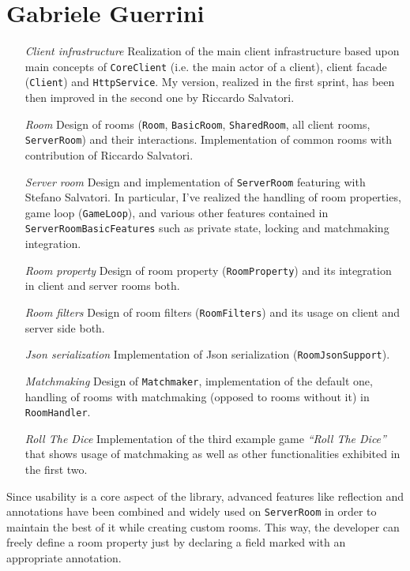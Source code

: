 \section{Gabriele Guerrini}

\begin{itemize}

\item[\em{Client infrastructure}] Realization of the main client infrastructure based upon main concepts of \texttt{CoreClient} (i.e. the main actor of a client), client facade (\texttt{Client}) and \texttt{HttpService}. My version, realized in the first sprint, has been then improved in the second one by Riccardo Salvatori.

\item[\em{Room}] Design of rooms (\texttt{Room}, \texttt{BasicRoom}, \texttt{SharedRoom}, all client rooms, \texttt{ServerRoom}) and their interactions. Implementation of common rooms with contribution of Riccardo Salvatori.

\item[\em{Server room}] Design and implementation of \texttt{ServerRoom} featuring with Stefano Salvatori. In particular, I've realized the handling of room properties, game loop (\texttt{GameLoop}), and various other features contained in \texttt{ServerRoomBasicFeatures} such as private state, locking and matchmaking integration.

\item[\em{Room property}] Design of room property (\texttt{RoomProperty}) and its integration in client and server rooms both.

\item[\em{Room filters}] Design of room filters (\texttt{RoomFilters}) and its usage on client and server side both.

\item[\em{Json serialization}] Implementation of Json serialization (\texttt{RoomJsonSupport}).

\item[\em{Matchmaking}] Design of \texttt{Matchmaker}, implementation of the default one, handling of rooms with matchmaking (opposed to rooms without it) in \texttt{RoomHandler}.

\item[\em{Roll The Dice}] Implementation of the third example game \textit{``Roll The Dice''} that shows usage of matchmaking as well as other functionalities exhibited in the first two.

\end{itemize}

Since usability is a core aspect of the library, advanced features like reflection and annotations have been combined and widely used on \texttt{ServerRoom} in order to maintain the best of it while creating custom rooms. This way, the developer can freely define a room property just by declaring a field marked with an appropriate annotation.





